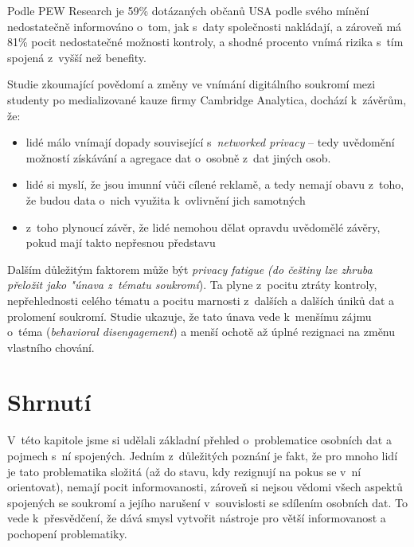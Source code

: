 Podle PEW Research je 59\% dotázaných občanů USA podle svého mínění nedostatečně informováno o~tom, jak s~daty společnosti nakládají, a zároveň má 81\% pocit nedostatečné možnosti kontroly, a shodné procento vnímá rizika s~tím spojená z~vyšší než benefity.\citep{lack-of-control}

Studie\citep{privacy-awareness} zkoumající povědomí a změny ve vnímání digitálního soukromí mezi studenty po medializované kauze firmy Cambridge Analytica, dochází k~závěrům, že:

\begin{itemize}
	\item lidé málo vnímají dopady související s~\textit{networked privacy} -- tedy uvědomění možností získávání a agregace dat o~osobně z~dat jiných osob.
	\item lidé si myslí, že jsou imunní vůči cílené reklamě, a tedy nemají obavu z~toho, že budou data o~nich využita k~ovlivnění jich samotných
	\item z~toho plynoucí závěr, že lidé nemohou dělat opravdu uvědomělé závěry, pokud mají takto nepřesnou představu
\end{itemize}

Dalším důležitým faktorem může být \textit{privacy fatigue (do češtiny lze zhruba přeložit jako "únava z~tématu soukromí})\citep{privacy-fatigue}. Ta plyne z~pocitu ztráty kontroly, nepřehlednosti celého tématu a pocitu marnosti z~dalších a dalších úniků dat a prolomení soukromí. Studie ukazuje, že tato únava vede k~menšímu zájmu o~téma (\textit{behavioral disengagement}) a menší ochotě až úplné rezignaci na změnu vlastního chování.

\section{Shrnutí}
V~této kapitole jsme si udělali základní přehled o~problematice osobních dat a pojmech s~ní spojených.
Jedním z~důležitých poznání je fakt, že pro mnoho lidí je tato problematika složitá (až do stavu, kdy rezignují na pokus se v~ní orientovat), nemají pocit informovanosti, zároveň si nejsou vědomi všech aspektů spojených se soukromí a jejího narušení v~souvislosti se sdílením osobních dat. To vede k~přesvědčení, že dává smysl vytvořit nástroje pro větší informovanost a pochopení problematiky.